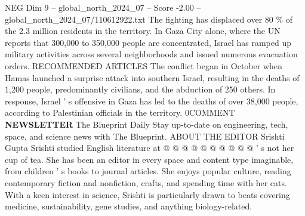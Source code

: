 \begin{textsample}{NEG Dim 9 – global\_north\_2024\_07 – Score -2.00 – global\_north\_2024\_07/110612922.txt}
The fighting has displaced over 80 \% of the 2.3 million residents in the territory.
In Gaza City alone, where the UN reports that 300,000 to 350,000 people are concentrated, Israel has ramped up military activities across several neighborhoods and issued numerous evacuation orders.
RECOMMENDED ARTICLES The conflict began in October when Hamas launched a surprise attack into southern Israel, resulting in the deaths of 1,200 people, predominantly civilians, and the abduction of 250 others.
In response, Israel ' s offensive in Gaza has led to the deaths of over 38,000 people, according to Palestinian officials in the territory. 0COMMENT \textbf{NEWSLETTER} The Blueprint Daily Stay up-to-date on engineering, tech, space, and science news with The Blueprint.
ABOUT THE EDITOR Srishti Gupta Srishti studied English literature at @ @ @ @ @ @ @ @ @ @ ' s not her cup of tea.
She has been an editor in every space and content type imaginable, from children ' s books to journal articles.
She enjoys popular culture, reading contemporary fiction and nonfiction, crafts, and spending time with her cats.
With a keen interest in science, Srishti is particularly drawn to beats covering medicine, sustainability, gene studies, and anything biology-related.

\end{textsample}
